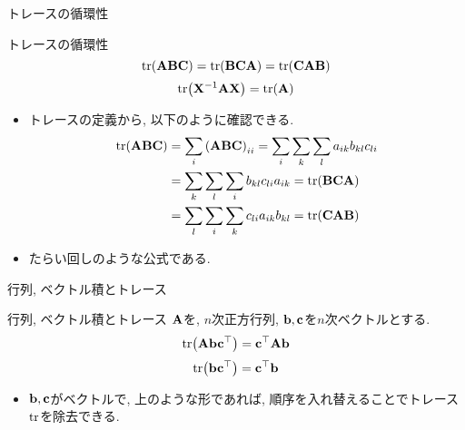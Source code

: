 \documentclass[dvipdfmx,notheorems,t]{beamer}
\begin{document}
\begin{frame}{トレースの循環性}
\begin{block}{トレースの循環性}
  $$\tr(\vb{A} \vb{B} \vb{C}) = \tr(\vb{B} \vb{C} \vb{A}) = \tr(\vb{C} \vb{A} \vb{B})$$
  $$\tr(\vb{X}^{-1} \vb{A} \vb{X}) = \tr(\vb{A})$$
\end{block}

\begin{itemize}
  \item トレースの定義から, 以下のように確認できる.
  \begin{align*}
    \tr(\vb{A} \vb{B} \vb{C}) &= \sum_i \left( \vb{A} \vb{B} \vb{C} \right)_{ii}
      = \sum_i \sum_k \sum_l a_{ik} b_{kl} c_{li} \\
      &= \sum_k \sum_l \sum_i b_{kl} c_{li} a_{ik} = \tr(\vb{B} \vb{C} \vb{A}) \\
      &= \sum_l \sum_i \sum_k c_{li} a_{ik} b_{kl} = \tr(\vb{C} \vb{A} \vb{B})
  \end{align*}
  \item たらい回しのような公式である.
\end{itemize}
\end{frame}

\begin{frame}{行列, ベクトル積とトレース}
\begin{block}{行列, ベクトル積とトレース}
  $\vb{A}$を, $n$次正方行列, $\vb{b}, \vb{c}$を$n$次ベクトルとする.
  $$\tr(\vb{A} \vb{b} \vb{c}^\top) = \vb{c}^\top \vb{A} \vb{b}$$
  $$\tr(\vb{b} \vb{c}^\top) = \vb{c}^\top \vb{b}$$
\end{block}

\begin{itemize}
  \item $\vb{b}, \vb{c}$がベクトルで, 上のような形であれば, 順序を入れ替えることでトレース$\tr$を除去できる.
\end{itemize}
\end{frame}
\end{document}
